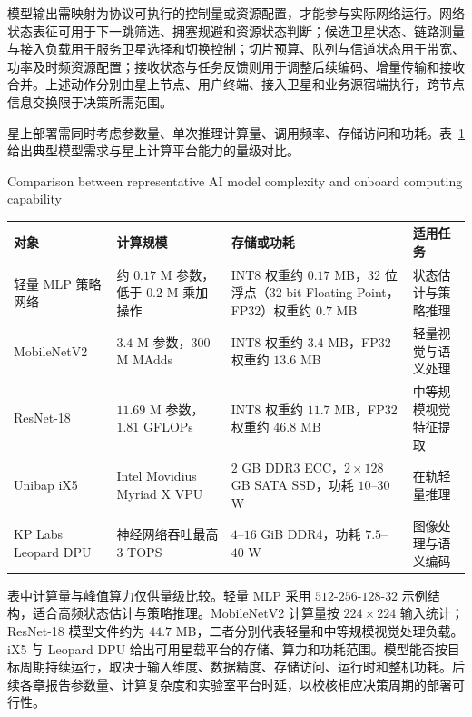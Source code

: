 模型输出需映射为协议可执行的控制量或资源配置，才能参与实际网络运行。网络状态表征可用于下一跳筛选、拥塞规避和资源状态判断；候选卫星状态、链路测量与接入负载用于服务卫星选择和切换控制；切片预算、队列与信道状态用于带宽、功率及时频资源配置；接收状态与任务反馈则用于调整后续编码、增量传输和接收合并。上述动作分别由星上节点、用户终端、接入卫星和业务源宿端执行，跨节点信息交换限于决策所需范围。

星上部署需同时考虑参数量、单次推理计算量、调用频率、存储访问和功耗。表~\ref{tab:onboard_ai_complexity} 给出典型模型需求与星上计算平台能力的量级对比。

\begin{table}[!htp]
\centering
\small
{}
{Comparison between representative AI model complexity and onboard computing capability}
\label{tab:onboard_ai_complexity}
\setlength{\tabcolsep}{3.5pt}
\renewcommand{\arraystretch}{1.22}
\begin{tabular}{p{} p{} p{} p{}}
\toprule
对象 & 计算规模 & 存储或功耗 & 适用任务 \\
\midrule
轻量 MLP 策略网络
& 约 $0.17$ M 参数，低于 $0.2$ M 乘加操作
& INT8 权重约 $0.17$ MB，32 位浮点（32-bit Floating-Point，FP32）权重约 $0.7$ MB
& 状态估计与策略推理 \\
\midrule
MobileNetV2
& $3.4$ M 参数，$300$ M MAdds~\cite{Sandler-MobileNetV2-CVPR18}
& INT8 权重约 $3.4$ MB，FP32 权重约 $13.6$ MB
& 轻量视觉与语义处理 \\
\midrule
ResNet-18
& $11.69$ M 参数，$1.81$ GFLOPs~\cite{Torchvision-ResNet18-Docs}
& INT8 权重约 $11.7$ MB，FP32 权重约 $46.8$ MB
& 中等规模视觉特征提取 \\
\midrule
Unibap iX5
& Intel Movidius Myriad X VPU~\cite{Unibap-IX5-ProductPage}
& $2$ GB DDR3 ECC，$2\times128$ GB SATA SSD，功耗 $10$--$30$ W~\cite{Unibap-IX5-ProductPage}
& 在轨轻量推理 \\
\midrule
KP Labs Leopard DPU
& 神经网络吞吐最高 $3$ TOPS~\cite{KPLabs-LeopardDPU-Datasheet}
& $4$--$16$ GiB DDR4，功耗 $7.5$--$40$ W~\cite{KPLabs-LeopardDPU-Datasheet}
& 图像处理与语义编码 \\
\bottomrule
\end{tabular}
\end{table}

表中计算量与峰值算力仅供量级比较。轻量 MLP 采用 $512$-$256$-$128$-$32$ 示例结构，适合高频状态估计与策略推理。MobileNetV2 计算量按 $224\times224$ 输入统计；ResNet-18 模型文件约为 $44.7$ MB，二者分别代表轻量和中等规模视觉处理负载。iX5 与 Leopard DPU 给出可用星载平台的存储、算力和功耗范围。模型能否按目标周期持续运行，取决于输入维度、数据精度、存储访问、运行时和整机功耗。后续各章报告参数量、计算复杂度和实验室平台时延，以校核相应决策周期的部署可行性。

